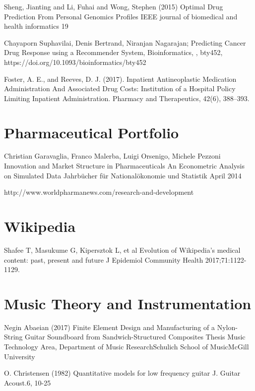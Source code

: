 \begin{thebibliography}{00}
Sheng, Jianting and Li, Fuhai and Wong, Stephen (2015)
\newblock Optimal Drug Prediction From Personal Genomics Profiles
\newblock IEEE journal of biomedical and health informatics 19

 Chayaporn Suphavilai, Denis Bertrand, Niranjan Nagarajan; 
\newblock Predicting Cancer Drug Response using a Recommender System, 
\newblock Bioinformatics, , bty452, https://doi.org/10.1093/bioinformatics/bty452

Foster, A. E., and Reeves, D. J. (2017). 
\newblock Inpatient Antineoplastic Medication Administration And Associated Drug Costs: Institution of a Hospital Policy Limiting Inpatient Administration. 
\newblock Pharmacy and Therapeutics, 42(6), 388–393.

\section{Pharmaceutical Portfolio}

 Christian Garavaglia, Franco Malerba, Luigi Orsenigo, Michele Pezzoni
\newblock Innovation and Market Structure in Pharmaceuticals An Econometric Analysis on Simulated Data
\newblock Jahrbücher für Nationalökonomie und Statistik April 2014

 http://www.worldpharmanews.com/research-and-development

\section{Wikipedia}

 Shafee T, Masukume G, Kipersztok L, et al
\newblock Evolution of Wikipedia’s medical content: past, present and future
\newblock J Epidemiol Community Health 2017;71:1122-1129.

\section{Music Theory and Instrumentation}

 Negin Abaeian (2017)
\newblock Finite Element Design and Manufacturing of a Nylon-String Guitar Soundboard from Sandwich-Structured Composites
\newblock Thesis Music Technology Area, Department of Music ResearchSchulich School of MusicMcGill University

 O. Christensen (1982)
\newblock Quantitative models for low frequency guitar
\newblock J. Guitar Acoust.6, 10-25 

\end{thebibliography}

